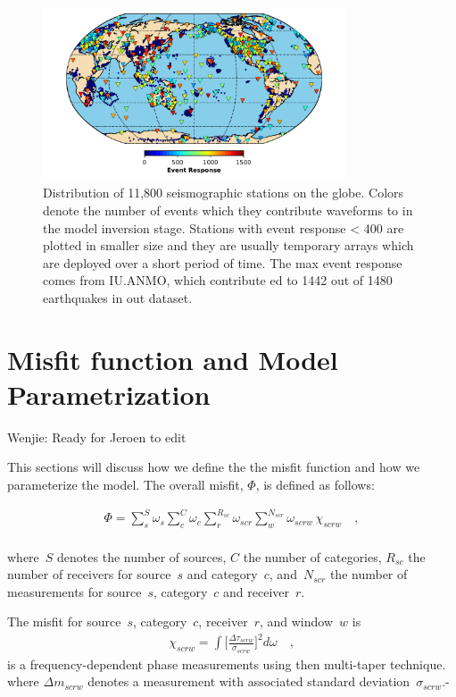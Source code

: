 \documentclass[extra,mreferee]{gji}
\begin{document}
\begin{figure}
  \includegraphics[width=0.8\textwidth]{figures/station_map.pdf}
  \caption{Distribution of 11,800 seismographic stations on the globe. Colors denote the number of events which they contribute waveforms to in the model inversion stage. Stations with event response < 400 are plotted in smaller size and they are usually temporary arrays which are deployed over a short period of time. The max event response comes from IU.ANMO, which contribute ed to 1442 out of 1480 earthquakes in out dataset.}
  \label{fig:stations}
  \centering
\end{figure}

\section{Misfit function and Model Parametrization}

{\color{Red} Wenjie: Ready for Jeroen to edit}

This sections will discuss how we define the the misfit function and how we parameterize the model.
The overall misfit, $\Phi$, is defined as follows:

\begin{align}
\label{eq:misfit}
\Phi = \sum_{s}^{S} \omega_s \sum_{c}^{C} \omega_{c} \sum_{r}^{R_{sc}} \omega_{scr} \sum_{w}^{N_{scr}} \omega_{scrw}\, \chi_{scrw}
\quad ,
\end{align}\\
where~$S$ denotes the number of sources, $C$ the number of categories,
$R_{sc}$ the number of receivers for source~$s$ and category~$c$,
and~$N_{scr}$ the number of measurements for source~$s$, category~$c$
and receiver~$r$.

The misfit for source~$s$, category~$c$, receiver~$r$, and window~$w$ is
\begin{align}
  \chi_{scrw} = \int \Big[ \frac {\Delta \tau_{scrw}} {\sigma_{scrw}} \Big]^2 d\omega
\quad ,
\end{align}
is a frequency-dependent phase measurements using then multi-taper technique.
where $\Delta m_{scrw}$ denotes a measurement with associated standard deviation~$\sigma_{scrw}$.-
\end{document}
